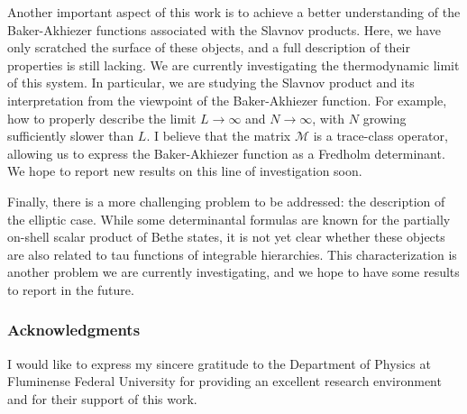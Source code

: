 \documentclass[a4paper,12pt]{amsart}
\begin{document}
Another important aspect of this work is to achieve a better
understanding of the Baker-Akhiezer functions associated with the
Slavnov products. Here, we have only scratched the surface of these
objects, and a full description of their properties is still
lacking. We are currently investigating the thermodynamic limit of
this system. In particular, we are studying the Slavnov product and
its interpretation from the viewpoint of the Baker-Akhiezer
function. For example, how to properly describe the limit \(L \to
\infty\) and \(N \to \infty\), with \(N\) growing sufficiently
slower than \(L\). I believe that the matrix \(\mathcal{M}\) is a
trace-class operator, allowing us to express the Baker-Akhiezer
function as a Fredholm determinant. We hope to report new results
on this line of investigation soon.

Finally, there is a more challenging problem to be addressed: the
description of the elliptic case. While some determinantal formulas
are known for the partially on-shell scalar product of Bethe states,
it is not yet clear whether these objects are also related to tau
functions of integrable hierarchies.  This characterization is another
problem we are currently investigating, and we hope to have some
results to report in the future.



\subsubsection*{Acknowledgments}

I would like to express my sincere gratitude to the Department of
Physics at Fluminense Federal University for providing an excellent
research environment and for their support of this work.




\end{document}
